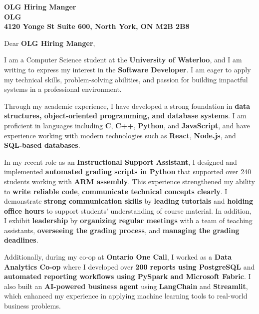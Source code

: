 \documentclass[11pt]{letter}
\date{} %
\newcommand{\hiringManager}{OLG Hiring Manger}
\newcommand{\companyName}{OLG}
\newcommand{\companyAddress}{4120 Yonge St Suite 600, North York, ON M2B 2B8}
\newcommand{\jobTitle}{Software Developer}
\begin{document}
\vspace{-1em}

\begin{letter}{\textbf{\hiringManager \\ \companyName \\ \companyAddress}}

\opening{Dear \textbf{ \hiringManager},}

\onehalfspacing

\hspace*{1cm} I am a Computer Science student at the \textbf{University of Waterloo}, and I am writing to express my interest in the\textbf{ \jobTitle}. I am eager to apply my technical skills, problem-solving abilities, and passion for building impactful systems in a professional environment.

\hspace*{1cm} Through my academic experience, I have developed a strong foundation in \textbf{data structures, object-oriented programming, and database systems}. I am proficient in languages including \textbf{C}, \textbf{C++}, \textbf{Python}, and \textbf{JavaScript}, and have experience working with modern technologies such as \textbf{React}, \textbf{Node.js}, and \textbf{SQL-based databases}.

\hspace*{1cm} In my recent role as an \textbf{Instructional Support Assistant}, I designed and implemented \textbf{automated grading scripts in Python} that supported over 240 students working with \textbf{ARM assembly}. This experience strengthened my ability to \textbf{write reliable code}, \textbf{communicate technical concepts clearly}. I demonstrate \textbf{strong communication skills} by \textbf{leading tutorials} and \textbf{holding office hours} to support students’ understanding of course material. In addition, I exhibit \textbf{leadership} by \textbf{organizing regular meetings} with a team of teaching assistants, \textbf{overseeing the grading process}, and \textbf{managing the grading deadlines}.

\hspace*{1cm} Additionally, during my co-op at \textbf{Ontario One Call}, I worked as a \textbf{Data Analytics Co-op} where I developed over \textbf{200 reports using PostgreSQL} and \textbf{automated reporting workflows using PySpark and Microsoft Fabric}. I also built an \textbf{AI-powered business agent} using \textbf{LangChain} and \textbf{Streamlit}, which enhanced my experience in applying machine learning tools to real-world business problems.


\end{letter}
\end{document}
